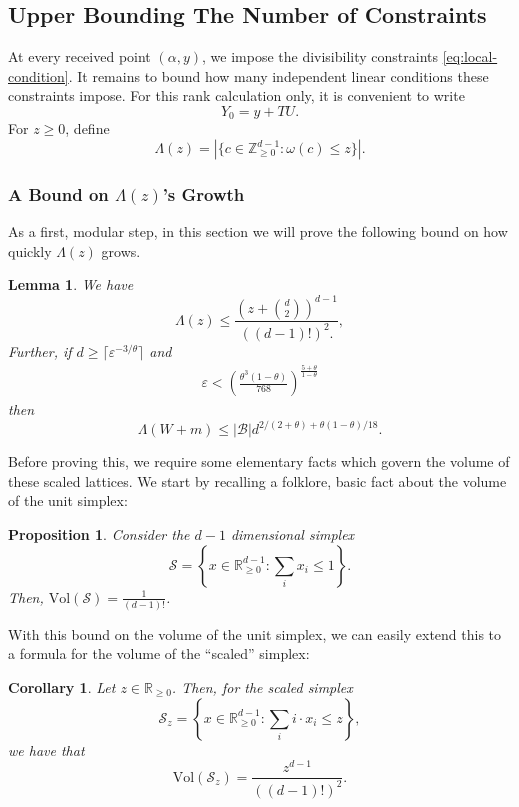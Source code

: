 \documentclass[11pt]{article}
\newtheorem{lemma}[theorem]{Lemma}
\newtheorem{proposition}[theorem]{Proposition}
\newtheorem{corollary}[theorem]{Corollary}
\newcommand{\eps}{\varepsilon}
\newcommand{\josh}[1]{{\color{green!50!black} {{[Josh: #1]}}}}
\newcommand{\louie}[1]{{\color{blue} {{[Louie: #1]}}}}
\begin{document}
\subsection{Upper Bounding The Number of Constraints}

At every received point $(\alpha,y)$, we impose the divisibility
constraints \eqref{eq:local-condition}. It remains to bound how
many independent linear conditions these constraints impose.
For this rank calculation only, it is convenient to write
\[
Y_0=y+TU.
\]
For $z\ge0$, define
\[
\Lambda(z)
=
\left \vert \{c\in\mathbb Z_{\ge0}^{d-1}:\omega(c)\le z  \} \right\vert.
\]

\subsubsection{A Bound on $\Lambda(z)$'s Growth}


As a first, modular step, in this section we will prove the following bound on how quickly $\Lambda(z)$ grows. 

\begin{lemma}
\label{lem:scaled-shell}
We have
\[
\Lambda(z)
\le
\frac{
\left(z+\binom{d}{2}\right)^{d-1}
}{
((d-1)!)^2.
},
\]
Further, if $d \ge \lceil \eps^{-3/\theta}\rceil$ and
\begin{align}
\eps < \left(\frac{\theta^3(1-\theta)}{768}\right)^{\frac{5+\theta}{1-\theta}}\label{eq:eps-theta-tradeoff}
\end{align}
then
\[
\Lambda(W+m) \leq |\mathcal{B}| d^{2/(2+\theta) + \theta(1-\theta)/18}.
\]
\end{lemma}

Before proving this, we require some elementary facts which govern the volume of these scaled lattices. We start by recalling a folklore, basic fact about the volume of the unit simplex:
\begin{proposition}\label{prop:simplexVolume}
    Consider the $d-1$ dimensional simplex 
    \[
    \mathcal{S} = \left \{x \in \mathbb{R}_{\geq 0}^{d-1}: \sum_i x_i \leq 1 \right \}.
    \]
    Then, $\mathrm{Vol}(\mathcal{S}) = \frac{1}{(d-1)!}$.
\end{proposition}

With this bound on the volume of the unit simplex, we can easily extend this to a formula for the volume of the ``scaled'' simplex:

\begin{corollary}\label{cor:scaledVolume}
    Let $z \in \mathbb{R}_{\geq 0}$. Then, for the scaled simplex 
    \[
    \mathcal{S}_z = \left \{ x \in \mathbb{R}_{\geq 0}^{d-1}: \sum_i i \cdot x_i  \leq z\right \},
    \]
    we have that 
    \[
    \mathrm{Vol}(\mathcal{S}_z) = \frac{z^{d-1}}{((d-1)!)^2}.
    \]
\end{corollary}
\end{document}
